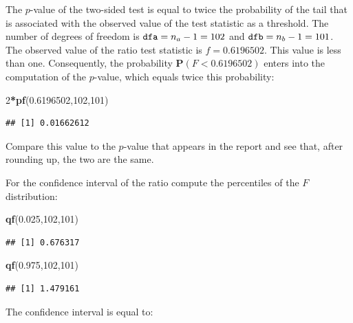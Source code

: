 \documentclass[
]{krantz}
\makeatletter
\newenvironment{Shaded}{\begin{snugshade}}{\end{snugshade}}
\newcommand{\DecValTok}[1]{\textcolor[rgb]{0.00,0.00,0.81}{#1}}
\newcommand{\FloatTok}[1]{\textcolor[rgb]{0.00,0.00,0.81}{#1}}
\newcommand{\KeywordTok}[1]{\textcolor[rgb]{0.13,0.29,0.53}{\textbf{#1}}}
\newcommand{\NormalTok}[1]{#1}
\newcommand{\OperatorTok}[1]{\textcolor[rgb]{0.81,0.36,0.00}{\textbf{#1}}}
\newcommand{\Prob}{\mathbf{P}}
\newenvironment{kframe}{%
\medskip{}
\setlength{\fboxsep}{.8em}
 \def\at@end@of@kframe{}%
 \ifinner\ifhmode%
  \def\at@end@of@kframe{\end{minipage}}%
  \begin{minipage}{\columnwidth}%
 \fi\fi%
 \def\FrameCommand##1{\hskip\@totalleftmargin \hskip-\fboxsep
 \colorbox{shadecolor}{##1}\hskip-\fboxsep
     \hskip-\linewidth \hskip-\@totalleftmargin \hskip\columnwidth}%
 \MakeFramed {\advance\hsize-\width
   \@totalleftmargin\z@ \linewidth\hsize
   \@setminipage}}%
 {\par\unskip\endMakeFramed%
 \at@end@of@kframe}
\renewenvironment{Shaded}{\begin{kframe}}{\end{kframe}}
\theoremstyle{definition}
\theoremstyle{definition}
\theoremstyle{definition}
\theoremstyle{remark}
\makeatother
\begin{document}
The \(p\)-value of the two-sided test is equal to twice the probability of
the tail that is associated with the observed value of the test
statistic as a threshold. The number of degrees of freedom is
\(\mbox{\texttt{dfa}} = n_a - 1 = 102\) and
\(\mbox{\texttt{dfb}} = n_b - 1 = 101\). The observed value of the ratio
test statistic is \(f = 0.6196502\). This value is less than one.
Consequently, the probability \(\Prob(F < 0.6196502)\) enters into the
computation of the \(p\)-value, which equals twice this probability:

\begin{Shaded}
\begin{Highlighting}[]
\DecValTok{2}\OperatorTok{*}\KeywordTok{pf}\NormalTok{(}\FloatTok{0.6196502}\NormalTok{,}\DecValTok{102}\NormalTok{,}\DecValTok{101}\NormalTok{)}
\end{Highlighting}
\end{Shaded}

\begin{verbatim}
## [1] 0.01662612
\end{verbatim}

Compare this value to the \(p\)-value that appears in the report and see
that, after rounding up, the two are the same.

For the confidence interval of the ratio compute the percentiles of the
\(F\) distribution:

\begin{Shaded}
\begin{Highlighting}[]
\KeywordTok{qf}\NormalTok{(}\FloatTok{0.025}\NormalTok{,}\DecValTok{102}\NormalTok{,}\DecValTok{101}\NormalTok{)}
\end{Highlighting}
\end{Shaded}

\begin{verbatim}
## [1] 0.676317
\end{verbatim}

\begin{Shaded}
\begin{Highlighting}[]
\KeywordTok{qf}\NormalTok{(}\FloatTok{0.975}\NormalTok{,}\DecValTok{102}\NormalTok{,}\DecValTok{101}\NormalTok{)}
\end{Highlighting}
\end{Shaded}

\begin{verbatim}
## [1] 1.479161
\end{verbatim}

The confidence interval is equal to:
\end{document}
